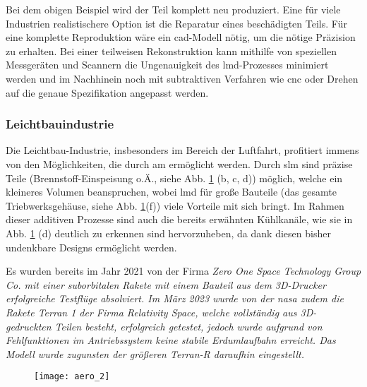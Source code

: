 \documentclass[../main.tex]{subfiles}
\begin{document}
Bei dem obigen Beispiel wird der Teil komplett neu produziert. 
Eine für viele Industrien realistischere Option ist die Reparatur eines beschädigten Teils. Für eine komplette Reproduktion wäre ein \acrshort{cad}-Modell nötig, um die nötige Präzision zu erhalten. 
Bei einer teilweisen Rekonstruktion kann mithilfe von speziellen Messgeräten und Scannern die Ungenauigkeit des \acrshort{lmd}-Prozesses minimiert werden und im Nachhinein noch mit subtraktiven Verfahren wie \acrfull{cnc} oder Drehen auf die genaue Spezifikation angepasst werden. 
\subsubsection{Leichtbauindustrie}
Die Leichtbau-Industrie, insbesonders im Bereich der Luftfahrt, profitiert immens von den Möglichkeiten, die durch \acrfull{am} ermöglicht werden. Durch \acrfull{slm} sind präzise Teile (Brennstoff-Einspeisung o.Ä., siehe Abb. \ref{img:aero_1} (b, c, d)) möglich, welche ein kleineres Volumen beanspruchen, wobei \acrfull{lmd} für große Bauteile (das gesamte Triebwerksgehäuse, siehe Abb. \ref{img:aero_1}(f)) viele Vorteile mit sich bringt. Im Rahmen dieser additiven Prozesse sind auch die bereits erwähnten Kühlkanäle, wie sie in Abb. \ref{img:aero_1} (d) deutlich zu erkennen sind hervorzuheben, da dank diesen bisher undenkbare Designs ermöglicht werden.

Es wurden bereits im Jahr 2021 von der Firma \it{Zero One Space Technology Group Co.} mit einer suborbitalen Rakete mit einem Bauteil aus dem 3D-Drucker erfolgreiche Testflüge absolviert. Im März 2023 wurde von der \acrfull{nasa} zudem die Rakete \it{Terran 1} der Firma \it{Relativity Space}, welche vollständig aus 3D-gedruckten Teilen besteht, erfolgreich getestet, jedoch wurde aufgrund von Fehlfunktionen im Antriebssystem keine stabile Erdumlaufbahn erreicht.\parencite{terran1_umlaufbahn} Das Modell wurde zugunsten der größeren \it{Terran-R} daraufhin eingestellt.\parencite{terran_r}

\begin{figure}[H]
	\centering
	\texttt{[image: aero\_2]}
	\label{img:aero_1}
\end{figure} 

\end{document}
